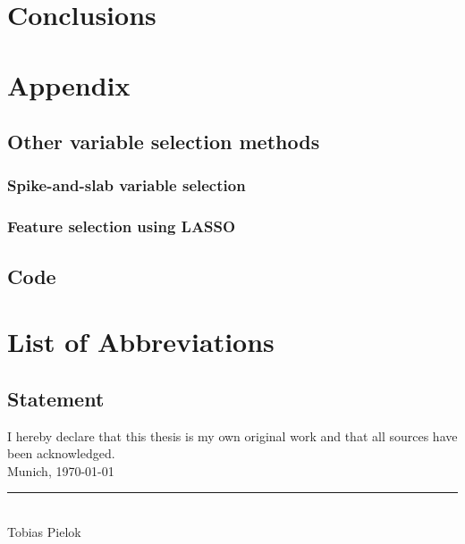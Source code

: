 \documentclass[12pt,letterpaper]{article}
\begin{document}
\pagebreak

\section{Conclusions}
\pagebreak
\section{Appendix}
\subsection{Other variable selection methods}
\subsubsection{Spike-and-slab variable selection}
\subsubsection{Feature selection using LASSO}
\pagebreak
\subsection{Code}
\pagebreak

\pagestyle{fancy}

 

\nocite{*} 
\clearpage

\listoffigures
{}
\clearpage


\section*{List of Abbreviations}
\begin{multicols}{2}
  \begin{acronym}[abr]
  \end{acronym}
\end{multicols}



\pagebreak
\subsection*{Statement}
\label{erklaerung}
\vspace*{0.5cm}
I hereby declare that this thesis is my own original work and that all sources have been acknowledged.\\[1.0cm]
Munich, \today \\[2.0cm]
\rule{6.0cm}{0.4pt} \\
Tobias Pielok
\end{document}

